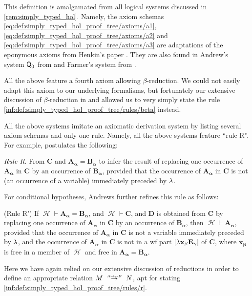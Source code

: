 \begin{comments}
  \item This definition is amalgamated from all \hyperref[con:logical_system]{logical systems} discussed in \cref{rem:simply_typed_hol}. Namely, the axiom schemas \eqref{eq:def:simply_typed_hol_proof_tree/axioms/a1}, \eqref{eq:def:simply_typed_hol_proof_tree/axioms/a2} and \eqref{eq:def:simply_typed_hol_proof_tree/axioms/a3} are adaptations of the eponymous axioms from Henkin's paper \cite[37]{Henkin1975Identity}. They are also found in Andrew's system \( \textsf{Q}_0 \) from \cite[\S 51]{Andrews2002Logic} and Farmer's system from \cite[278]{Farmer2008STTVirtues}.

  All the above feature a fourth axiom allowing \( \beta \)-reduction. We could not easily adapt this axiom to our underlying formalisms, but fortunately our extensive discussion of \( \beta \)-reduction in  and  allowed us to very simply state the rule \ref{inf:def:simply_typed_hol_proof_tree/rules/beta} instead.

  All the above systems imitate an axiomatic derivation system by listing several axiom schemas and only one rule. Namely, all the above systems feature \enquote{rule R}. For example,  postulates the following:
  \begin{displayquote}
    \textit{Rule R}. From \( \mathbf{C} \) and \( \mathbf{A_\alpha} = \mathbf{B_\alpha} \) to infer the result of replacing one occurrence of \( \mathbf{A_\alpha} \) in \( \mathbf{C} \) by an occurrence of \( \mathbf{B_\alpha} \), provided that the occurrence of \( \mathbf{A_\alpha} \) in \( \mathbf{C} \) is not (an occurrence of a variable) immediately preceded by \( {\mathrm \lambda} \).
  \end{displayquote}

  For conditional hypotheses, Andrews further refines this rule as follows:
  \begin{displayquote}
    (Rule R') If \( \mscrH \vdash \mathbf{A_\alpha} = \mathbf{B_\alpha} \), and \( \mscrH \vdash \mathbf{C} \), and \( \mathbf{D} \) is obtained from \( \mathbf{C} \) by replacing one occurrence of \( \mathbf{A_\alpha} \) in \( \mathbf{C} \) by an occurrence of \( \mathbf{B_\alpha} \), then \( \mscrH \vdash \mathbf{A_\alpha} \), provided that the occurrence of \( \mathbf{A_\alpha} \) in \( \mathbf{C} \) is not a variable immediately preceded by \( \mathbf{{\mathrm \lambda}} \), and the occurrence of \( \mathbf{A_\alpha} \) in \( \mathbf{C} \) is not in a wf part \( [\mathbf{{\mathrm \lambda} x_\beta E_\gamma}] \) of \( \mathbf{C} \), where \( \mathbf{x_\beta} \) is free in a member of \( \mscrH \) and free in \( \mathbf{A_\alpha} = \mathbf{B_\alpha} \).
  \end{displayquote}

  Here we have again relied on our extensive discussion of reductions in order to define an appropriate relation \( M \redrel{A \mapsto_\Gamma B} N \), apt for stating \ref{inf:def:simply_typed_hol_proof_tree/rules/r}.
\end{comments}

